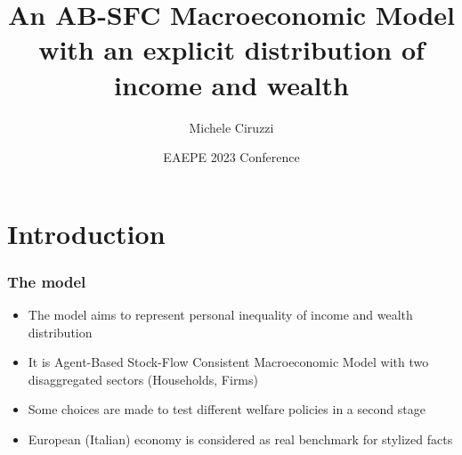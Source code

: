 \documentclass[]{beamer}
\title[DAS]{An AB-SFC Macroeconomic Model with an explicit distribution of income and wealth}
\author[Ciruzzi, M.]{Michele Ciruzzi}
\institute[UnInsubria]{Università degli Studi dell'Insubria}
\date{EAEPE 2023 Conference}
\begin{document}
\frame{\titlepage}

\section{Introduction}

\begin{frame}
	\frametitle{The model}
	\begin{itemize}
		\item The model aims to represent personal inequality of income and wealth distribution
		\item It is Agent-Based Stock-Flow Consistent Macroeconomic Model with two disaggregated sectors (Households, Firms)
		\item Some choices are made to test different welfare policies in a second stage
		\item European (Italian) economy is considered as real benchmark for stylized facts
	\end{itemize}
\end{frame}
\end{document}
